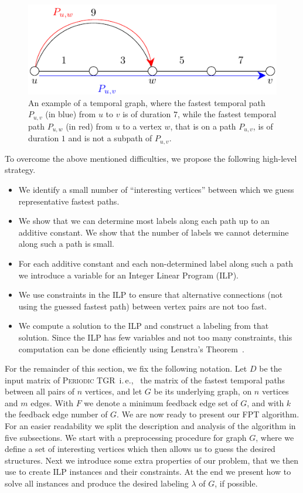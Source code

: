 \documentclass[a4paper,UKenglish,cleveref, autoref, thm-restate, anonymous]{lipics-v2021}
\newcommand{\ie}{i.\,e.,\ }
\newcommand{\deltaExact}{\textsc{Periodic TGR}}
\begin{document}
	\begin{figure}[t]
    \centering
	\includegraphics{fig-motivationExample}
	\caption{An example of a temporal graph, where the fastest temporal path $P_{u,v}$ (in blue) from $u$ to $v$ is of duration $7$,
		while the fastest temporal path $P_{u,w}$ (in red) from $u$ to a vertex $w$, that is on a path $P_{u,v}$, is of duration $1$ and is not a subpath of $P_{u,v}$.		
		\label{fig:ftpExample}}
	\end{figure}

To overcome the above mentioned difficulties, we propose the following high-level strategy.
\begin{itemize}
    \item We identify a small number of ``interesting vertices'' between which we guess representative fastest paths.
    \item We show that we can determine most labels along each path up to an additive constant. We show that the number of labels we cannot determine along such a path is small. 
    \item For each additive constant and each non-determined label along such a path we introduce a variable for an Integer Linear Program (ILP). 
    \item We use constraints in the ILP to ensure that alternative connections (not using the guessed fastest path) between vertex pairs are not too fast.
    \item We compute a solution to the ILP and construct a labeling from that solution. Since the ILP has few variables and not too many constraints, this computation can be done efficiently using Lenstra's Theorem~\cite{Lenstra1983Integer}.
\end{itemize}


For the remainder of this section, we fix the following notation. 
Let $D$ be the input matrix of \deltaExact\ \ie
the matrix of the fastest temporal paths between all pairs of $n$ vertices, and let $G$ be its underlying graph, on $n$ vertices and $m$ edges.
With $F$ we denote a minimum feedback edge set of $G$, and with $k$ the feedback edge number of $G$.
We are now ready to present our FPT algorithm. For an easier readability we split the description and analysis of the algorithm in five subsections.
We start with a preprocessing procedure for graph $G$, where we define a set of interesting vertices which then allows us to guess the desired structures.
Next we introduce some extra properties of our problem, that we then use to create ILP instances and their constraints.
At the end we present how to solve all instances and produce the desired labeling $\lambda$ of $G$, if possible.
\end{document}
